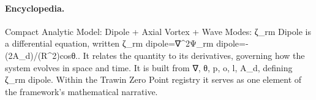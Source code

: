 \paragraph{Encyclopedia.}
Compact Analytic Model: Dipole + Axial Vortex + Wave Modes: ζ\_rm Dipole is a differential equation, written ζ\_rm dipole=∇\textasciicircum{}2Ψ\_rm dipole=-(2A\_d)/(R\textasciicircum{}2)cosθ.. It relates the quantity to its derivatives, governing how the system evolves in space and time. It is built from ∇, θ, p, o, l, A\_d, defining ζ\_rm dipole. Within the Trawin Zero Point registry it serves as one element of the framework's mathematical narrative.
